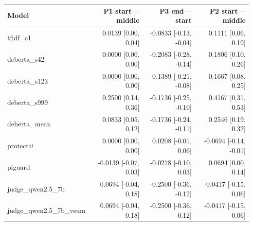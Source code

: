 \begin{tabular}{lrrr}
\toprule
\textbf{Model} & \textbf{P1 start $-$ middle} & \textbf{P3 end $-$ start} & \textbf{P2 start $-$ middle} \\
\midrule
tfidf\_c1 & 0.0139 {\scriptsize[0.00, 0.04]} & -0.0833 {\scriptsize[-0.13, -0.04]} & 0.1111 {\scriptsize[0.06, 0.19]} \\
deberta\_s42 & 0.0000 {\scriptsize[0.00, 0.00]} & -0.2083 {\scriptsize[-0.28, -0.14]} & 0.1806 {\scriptsize[0.10, 0.26]} \\
deberta\_s123 & 0.0000 {\scriptsize[0.00, 0.00]} & -0.1389 {\scriptsize[-0.21, -0.08]} & 0.1667 {\scriptsize[0.08, 0.25]} \\
deberta\_s999 & 0.2500 {\scriptsize[0.14, 0.36]} & -0.1736 {\scriptsize[-0.25, -0.10]} & 0.4167 {\scriptsize[0.31, 0.53]} \\
deberta\_mean & 0.0833 {\scriptsize[0.05, 0.12]} & -0.1736 {\scriptsize[-0.24, -0.11]} & 0.2546 {\scriptsize[0.19, 0.32]} \\
protectai & 0.0000 {\scriptsize[0.00, 0.00]} & 0.0208 {\scriptsize[-0.01, 0.06]} & -0.0694 {\scriptsize[-0.14, -0.01]} \\
piguard & -0.0139 {\scriptsize[-0.07, 0.03]} & -0.0278 {\scriptsize[-0.10, 0.03]} & 0.0694 {\scriptsize[0.00, 0.14]} \\
judge\_qwen2.5\_7b & 0.0694 {\scriptsize[-0.04, 0.18]} & -0.2500 {\scriptsize[-0.36, -0.12]} & -0.0417 {\scriptsize[-0.15, 0.06]} \\
judge\_qwen2.5\_7b\_vsum & 0.0694 {\scriptsize[-0.04, 0.18]} & -0.2500 {\scriptsize[-0.36, -0.12]} & -0.0417 {\scriptsize[-0.15, 0.06]} \\
\bottomrule
\end{tabular}
